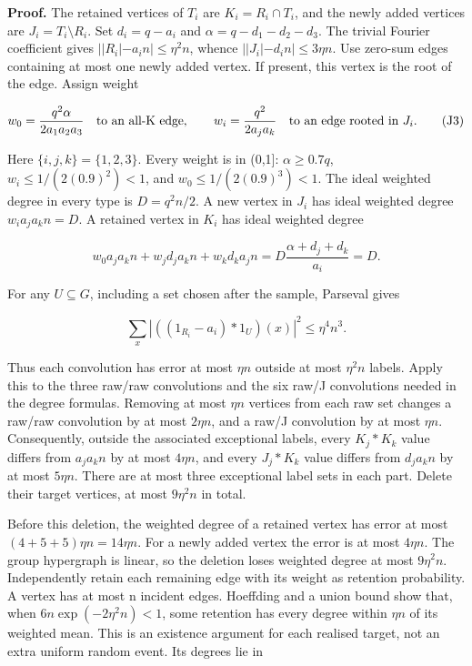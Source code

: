 \documentclass[11pt,a4paper]{article}
\newcommand{\labelledparagraphstart}{\par\addvspace{3pt plus 1pt minus 1pt}\noindent}
\begin{document}
\labelledparagraphstart\textbf{Proof.} The retained vertices of \(T_i\) are \(K_i=R_i\cap T_i\), and the newly added vertices are \(J_i=T_i\setminus R_i\). Set \(d_i=q-a_i\) and \(\alpha=q-d_1-d_2-d_3\). The trivial Fourier coefficient gives \(||R_i|-a_i n|\le \eta^2 n\), whence \(||J_i|-d_i n|\le 3\eta n\). Use zero-sum edges containing at most one newly added vertex. If present, this vertex is the root of the edge. Assign weight

\begin{equation}
w_0=\frac{q^2\alpha}{2a_1a_2a_3}
\quad\hbox{to an all-K edge},\qquad
w_i=\frac{q^2}{2a_ja_k}
\quad\hbox{to an edge rooted in }J_i.
\tag{J3}\label{eq:J3}
\end{equation}

Here \(\{i,j,k\}=\{1,2,3\}\). Every weight is in (0,1{]}: \(\alpha\ge 0.7q\), \(w_i\le 1/(2(0.9)^2)<1\), and \(w_0\le 1/(2(0.9)^3)<1\). The ideal weighted degree in every type is \(D=q^2 n/2\). A new vertex in \(J_i\) has ideal weighted degree \(w_i a_j a_k n=D\). A retained vertex in \(K_i\) has ideal weighted degree

\begin{equation}
w_0a_ja_kn+w_jd_ja_kn+w_kd_ka_jn
=D\frac{\alpha+d_j+d_k}{a_i}=D.
\tag{J4}\label{eq:J4}
\end{equation}

For any \(U\subseteq G\), including a set chosen after the sample, Parseval gives

\begin{equation}
\sum_x|((1_{R_i}-a_i)*1_U)(x)|^2\le\eta^4 n^3.
\tag{J5}\label{eq:J5}
\end{equation}

Thus each convolution has error at most \(\eta n\) outside at most \(\eta^2 n\) labels. Apply this to the three raw/raw convolutions and the six raw/J convolutions needed in the degree formulas. Removing at most \(\eta n\) vertices from each raw set changes a raw/raw convolution by at most \(2\eta n\), and a raw/J convolution by at most \(\eta n\). Consequently, outside the associated exceptional labels, every \(K_j*K_k\) value differs from \(a_j a_k n\) by at most \(4\eta n\), and every \(J_j*K_k\) value differs from \(d_j a_k n\) by at most \(5\eta n\). There are at most three exceptional label sets in each part. Delete their target vertices, at most \(9\eta^2 n\) in total.

Before this deletion, the weighted degree of a retained vertex has error at most \((4+5+5)\eta n=14\eta n\). For a newly added vertex the error is at most \(4\eta n\). The group hypergraph is linear, so the deletion loses weighted degree at most \(9\eta^2 n\). Independently retain each remaining edge with its weight as retention probability. A vertex has at most n incident edges. Hoeffding and a union bound show that, when \(6n \exp(-2\eta^2 n)<1\), some retention has every degree within \(\eta n\) of its weighted mean. This is an existence argument for each realised target, not an extra uniform random event. Its degrees lie in
\end{document}
